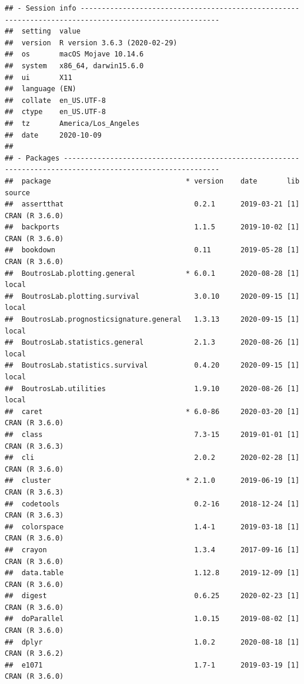 \documentclass[]{article}
\begin{document}
\begin{verbatim}
## - Session info -------------------------------------------------------------------------------------------------------
##  setting  value                       
##  version  R version 3.6.3 (2020-02-29)
##  os       macOS Mojave 10.14.6        
##  system   x86_64, darwin15.6.0        
##  ui       X11                         
##  language (EN)                        
##  collate  en_US.UTF-8                 
##  ctype    en_US.UTF-8                 
##  tz       America/Los_Angeles         
##  date     2020-10-09                  
## 
## - Packages -----------------------------------------------------------------------------------------------------------
##  package                                * version    date       lib source        
##  assertthat                               0.2.1      2019-03-21 [1] CRAN (R 3.6.0)
##  backports                                1.1.5      2019-10-02 [1] CRAN (R 3.6.0)
##  bookdown                                 0.11       2019-05-28 [1] CRAN (R 3.6.0)
##  BoutrosLab.plotting.general            * 6.0.1      2020-08-28 [1] local         
##  BoutrosLab.plotting.survival             3.0.10     2020-09-15 [1] local         
##  BoutrosLab.prognosticsignature.general   1.3.13     2020-09-15 [1] local         
##  BoutrosLab.statistics.general            2.1.3      2020-08-26 [1] local         
##  BoutrosLab.statistics.survival           0.4.20     2020-09-15 [1] local         
##  BoutrosLab.utilities                     1.9.10     2020-08-26 [1] local         
##  caret                                  * 6.0-86     2020-03-20 [1] CRAN (R 3.6.0)
##  class                                    7.3-15     2019-01-01 [1] CRAN (R 3.6.3)
##  cli                                      2.0.2      2020-02-28 [1] CRAN (R 3.6.0)
##  cluster                                * 2.1.0      2019-06-19 [1] CRAN (R 3.6.3)
##  codetools                                0.2-16     2018-12-24 [1] CRAN (R 3.6.3)
##  colorspace                               1.4-1      2019-03-18 [1] CRAN (R 3.6.0)
##  crayon                                   1.3.4      2017-09-16 [1] CRAN (R 3.6.0)
##  data.table                               1.12.8     2019-12-09 [1] CRAN (R 3.6.0)
##  digest                                   0.6.25     2020-02-23 [1] CRAN (R 3.6.0)
##  doParallel                               1.0.15     2019-08-02 [1] CRAN (R 3.6.0)
##  dplyr                                    1.0.2      2020-08-18 [1] CRAN (R 3.6.2)
##  e1071                                    1.7-1      2019-03-19 [1] CRAN (R 3.6.0)

\end{verbatim}
\end{document}
